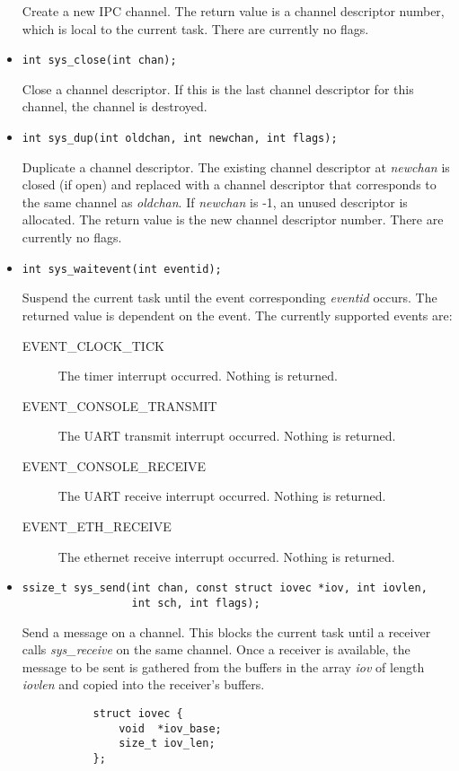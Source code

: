 \documentclass[letterpaper]{article}
\begin{document}
\begin{itemize}
Create a new IPC channel. The return value is a channel descriptor number, which
is local to the current task. There are currently no flags.
\item \begin{verbatim}int sys_close(int chan);\end{verbatim}
Close a channel descriptor. If this is the last channel descriptor for
this channel, the channel is destroyed.
\item \begin{verbatim}int sys_dup(int oldchan, int newchan, int flags);\end{verbatim}
Duplicate a channel descriptor. The existing channel descriptor at \emph{newchan} is closed (if open) and replaced with a channel
descriptor that corresponds to the same channel as \emph{oldchan}. If \emph{newchan} is -1, an unused
descriptor is allocated. The return value is the new channel descriptor number. There are currently no flags.
\item \begin{verbatim}int sys_waitevent(int eventid);\end{verbatim}
Suspend the current task until the event corresponding \emph{eventid} occurs. The returned value
is dependent on the event. The currently supported events are:
\begin{description}
\item[EVENT\_CLOCK\_TICK] The timer interrupt occurred. Nothing is returned.
\item[EVENT\_CONSOLE\_TRANSMIT] The UART transmit interrupt occurred. Nothing is returned.
\item[EVENT\_CONSOLE\_RECEIVE] The UART receive interrupt occurred. Nothing is returned.
\item[EVENT\_ETH\_RECEIVE] The ethernet receive interrupt occurred. Nothing is returned.
\end{description}

\item \begin{verbatim}
ssize_t sys_send(int chan, const struct iovec *iov, int iovlen,
                 int sch, int flags);\end{verbatim}
	Send a message on a channel. This blocks the current task until a receiver calls \emph{sys\_receive} on the
	same channel. Once a receiver is available, the message to be sent is gathered from the buffers in the array
	\emph{iov} of length \emph{iovlen} and copied into the receiver's buffers.

	\begin{verbatim}
           struct iovec {
               void  *iov_base;
               size_t iov_len;
           };
	\end{verbatim}


\end{itemize}
\end{document}
